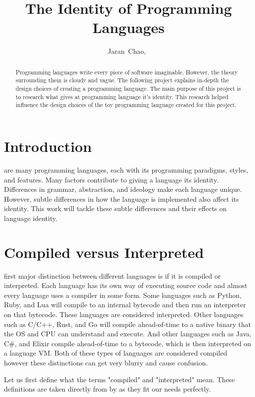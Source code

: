 \documentclass[./subfile.tex]{subfiles}
\title{The Identity of Programming Languages}
\author{
    Jaran~Chao,~\IEEEmembership{BS,~Comp.~Sci.}
}
\begin{document}
    \maketitle
    
    \begin{abstract}
        Programming languages write every piece of software imaginable. However, the theory surrounding them is cloudy and vague. The following project explains in-depth the design choices of creating a programming language. The main purpose of this project is to research what gives at programming language it's identity. This research helped influence the design choices of the toy programming language created for this project.
    \end{abstract}

    \section{Introduction}
         are many programming languages, each with its programming paradigms, styles, and features. Many factors contribute to giving a language its identity. Differences in grammar, abstraction, and ideology make each language unique. However, subtle differences in how the language is implemented also affect its identity. This work will tackle these subtle differences and their effects on language identity.
        
    \section{Compiled versus Interpreted}
         first major distinction between different languages is if it is compiled or interpreted. Each language has its own way of executing source code and almost every language uses a compiler in some form. Some languages such as Python, Ruby, and Lua will compile to an internal bytecode and then run an interpreter on that bytecode. These languages are considered interpreted. Other languages such as C/C++, Rust, and Go will compile ahead-of-time to a native binary that the OS and CPU can understand and execute. And other languages such as Java, C\#, and Elixir compile ahead-of-time to a bytecode, which is then interpreted on a language VM. Both of these types of languages are considered compiled however these distinctions can get very blurry and cause confusion. 
        
        Let us first define what the terms "compiled" and "interpreted" mean. These definitions are taken directly from \cite{nystrom_2021} by \citeauthor{nystrom_2021} as they fit our needs perfectly.
        
\end{document}
